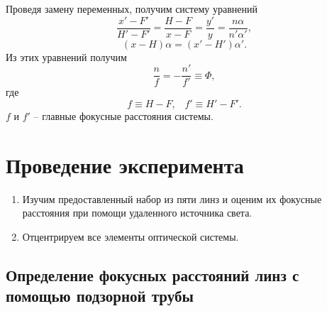 \documentclass[14pt, a4paper]{report}
\begin{document}
Проведя замену переменных, получим систему уравнений
\begin{equation}\label{grid}
	\frac{x' - F'}{H' - F'}= \frac{H-F}{x- F} = \frac{y'}{y} = \frac{n \alpha}{n' \alpha'},
\end{equation}
\begin{equation}\label{grid1}
	(x-H)\alpha= (x' - H')\alpha'.
\end{equation}
Из этих уравнений получим
\begin{equation}\label{Ф}
	\frac{n}{f} = -\frac{n'}{f'} \equiv \Phi,
\end{equation}
где
\begin{equation}\label{focus-len}
	f\equiv H - F, \;\;\; f'\equiv H' - F'.
\end{equation}
$ f $ и $ f' $ -- главные фокусные расстояния системы.

\section{Проведение эксперимента}

\begin{enumerate}

\item Изучим предоставленный набор из пяти линз и оценим их фокусные расстояния при помощи удаленного источника света.

\item Отцентрируем все элементы оптической системы.

\end{enumerate}

\subsection{Определение фокусных расстояний линз с помощью подзорной трубы}
\end{document}
